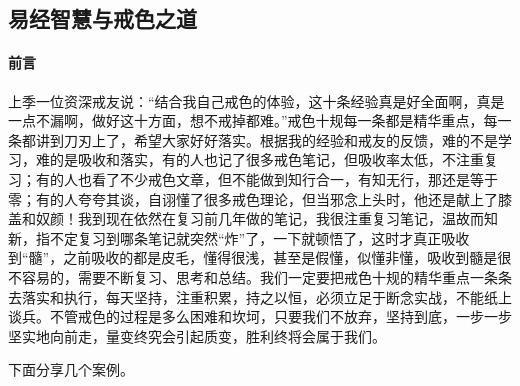 \subsection{易经智慧与戒色之道}

\paragraph{前言}

上季一位资深戒友说：“结合我自己戒色的体验，这十条经验真是好全面啊，真是一点不漏啊，做好这十方面，想不戒掉都难。”戒色十规每一条都是精华重点，每一条都讲到刀刃上了，希望大家好好落实。根据我的经验和戒友的反馈，难的不是学习，难的是吸收和落实，有的人也记了很多戒色笔记，但吸收率太低，不注重复习；有的人也看了不少戒色文章，但不能做到知行合一，有知无行，那还是等于零；有的人夸夸其谈，自诩懂了很多戒色理论，但当邪念上头时，他还是献上了膝盖和奴颜！我到现在依然在复习前几年做的笔记，我很注重复习笔记，温故而知新，指不定复习到哪条笔记就突然“炸”了，一下就顿悟了，这时才真正吸收到“髓”，之前吸收的都是皮毛，懂得很浅，甚至是假懂，似懂非懂，吸收到髓是很不容易的，需要不断复习、思考和总结。我们一定要把戒色十规的精华重点一条条去落实和执行，每天坚持，注重积累，持之以恒，必须立足于断念实战，不能纸上谈兵。不管戒色的过程是多么困难和坎坷，只要我们不放弃，坚持到底，一步一步坚实地向前走，量变终究会引起质变，胜利终将会属于我们。

下面分享几个案例。

